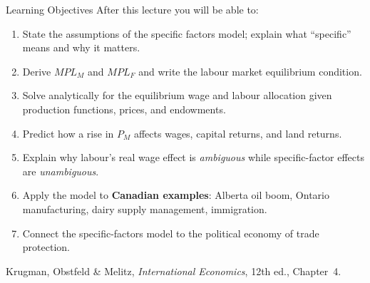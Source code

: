 \documentclass[aspectratio=169]{beamer}
\begin{document}
\begin{frame}{Learning Objectives}
After this lecture you will be able to:
\begin{enumerate}\small
  \item State the assumptions of the specific factors model;
        explain what ``specific'' means and why it matters.
  \item Derive $MPL_M$ and $MPL_F$ and write the labour
        market equilibrium condition.
  \item Solve analytically for the equilibrium wage and
        labour allocation given production functions, prices,
        and endowments.
  \item Predict how a rise in $P_M$ affects wages, capital
        returns, and land returns.
  \item Explain why labour's real wage effect is
        \emph{ambiguous} while specific-factor effects are
        \emph{unambiguous}.
  \item Apply the model to \textbf{Canadian examples}:
        Alberta oil boom, Ontario manufacturing, dairy
        supply management, immigration.
  \item Connect the specific-factors model to the political
        economy of trade protection.
\end{enumerate}
\begin{block}{}
\small Krugman, Obstfeld \& Melitz,
\textit{International Economics}, 12th ed., Chapter~4.
\end{block}
\end{frame}

\end{document}
